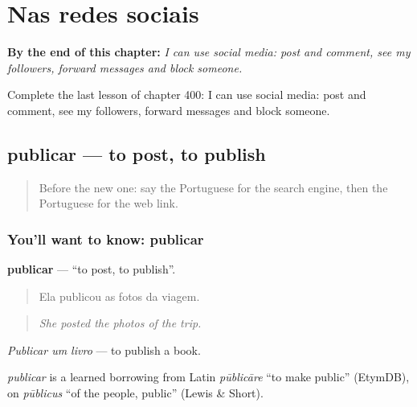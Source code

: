 
\chapter{Nas redes sociais}
\label{ch:pt-nas-redes-sociais}

\begin{chapteropening}
\textbf{By the end of this chapter:} \emph{I can use social media: post and comment, see my followers, forward messages and block someone.}

Complete the last lesson of chapter 400: I can use social media: post and comment, see my followers, forward messages and block someone.
\end{chapteropening}

\section[publicar]{publicar — to post, to publish}

\label{lesson:PT-C400-publicar}



\begin{quote}
Before the new one: say the Portuguese for the search engine, then the Portuguese for the web link.
\end{quote}

\subsection*{You'll want to know: publicar}
\textbf{publicar} — \textquotedblleft{}to post, to publish\textquotedblright{}.

\begin{quote}
Ela publicou as fotos da viagem.
\end{quote}

\begin{quote}
\emph{She posted the photos of the trip.}
\end{quote}

\emph{Publicar um livro} — to publish a book.

\begin{cousinweb}
\emph{publicar} is a learned borrowing from Latin \emph{pūblicāre} \textquotedblleft{}to make public\textquotedblright{} (EtymDB), on \emph{pūblicus} \textquotedblleft{}of the people, public\textquotedblright{} (Lewis \& Short).
\end{cousinweb}

